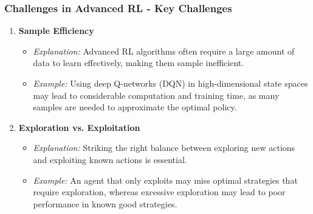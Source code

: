 \documentclass{beamer}
\begin{document}
\begin{frame}[fragile]
    \frametitle{Challenges in Advanced RL - Key Challenges}
    \begin{enumerate}
        \item \textbf{Sample Efficiency}
        \begin{itemize}
            \item \textit{Explanation:} Advanced RL algorithms often require a large amount of data to learn effectively, making them sample inefficient.
            \item \textit{Example:} Using deep Q-networks (DQN) in high-dimensional state spaces may lead to considerable computation and training time, as many samples are needed to approximate the optimal policy.
        \end{itemize}

        \item \textbf{Exploration vs. Exploitation}
        \begin{itemize}
            \item \textit{Explanation:} Striking the right balance between exploring new actions and exploiting known actions is essential.
            \item \textit{Example:} An agent that only exploits may miss optimal strategies that require exploration, whereas excessive exploration may lead to poor performance in known good strategies.
        \end{itemize}
    \end{enumerate}
\end{frame}
\end{document}
